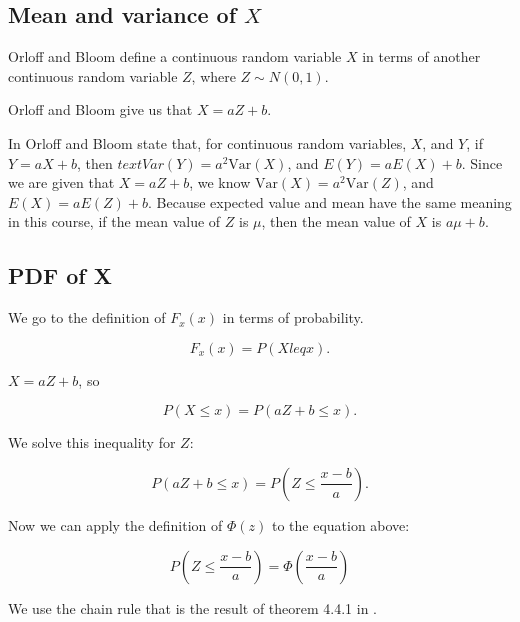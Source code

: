 \documentclass[a4paper,11pt]{article}
\begin{document}
\subsection{Mean and variance of $X$} \label{meanVarX}
Orloff and Bloom define a continuous random variable $X$ in terms of another
continuous random variable $Z$, where $Z \sim N \left(0, 1 \right)$.

Orloff and Bloom give us that $X = aZ + b$.

In \cite{reading5d} Orloff and Bloom state that, for continuous random
variables, $X$, and $Y$, if $Y = aX + b$, then
$text{Var}\left(Y \right) = a^{2}\text{Var}\left(X \right)$, and
$E \left( Y \right) = aE\left(X \right) + b$.
Since we are given that $X = aZ + b$, we know
$\text{Var}\left(X \right) = a^{2}\text{Var} \left( Z \right)$, and
$E\left(X \right) = aE\left(Z \right)+b$.  Because expected value and mean
have the same meaning in this course, if the mean value of $Z$ is $\mu$,
then the mean value of $X$ is $a\mu+b$.

\subsection{PDF of X} \label{pdfX}

We go to the definition of $F_x \left( x \right)$ in terms of probability.

\begin{equation}
F_x \left( x \right) = P \left( X leq x \right).
\end{equation}

$X = aZ + b$, so

\begin{equation}
	P \left( X \leq x \right) =
	P \left( aZ + b \leq x \right).
\end{equation}

We solve this inequality for $Z$:

\begin{equation}
	P \left( aZ + b \leq x \right) =
	P \left( Z \leq \frac{x-b}{a} \right).
\end{equation}

Now we can apply the definition of $\Phi \left( z \right)$ to the equation
above:

\begin{equation}
	P \left( Z \leq \frac{x-b}{a} \right) =
		\Phi \left( \frac{x-b}{a} \right)
\end{equation}


We use the chain rule that is the result of theorem 4.4.1 in \cite{chainRule}.
\end{document}
